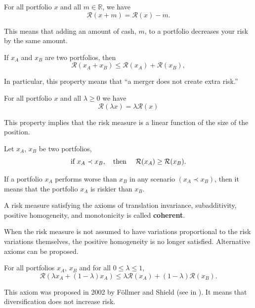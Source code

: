 \begin{axiom} For all portfolio $x$ and all $m\in\mathbb{R}$,  we have
	\[
		\mathcal{R}(x+m) = \mathcal{R}(x)-m.
	\]
\end{axiom}
This means that adding an amount of cash, $m$, to a portfolio decreases your risk by the same amount.

\begin{axiom}[Subadditivity] If $x_A$ and $x_B$ are two portfolios, then
	\[
		\mathcal{R}(x_A+x_B) \leq \mathcal{R}(x_A) + \mathcal{R}(x_B),
	\]
\end{axiom}
In particular, this property means that ``a merger does not create extra risk.''

\begin{axiom} For all portfolio $x$ and all $\lambda\geq 0$ we have
	\[
		\mathcal{R}(\lambda x) = \lambda \mathcal{R}(x)
	\]
\end{axiom}
This property implies that the risk measure is a linear function of the size of the position.

\begin{axiom}[Monotonicity] Let $x_A$, $x_B$ be two portfolios,
	\[
		\mbox{if } x_A \prec x_B, \quad \mbox{then } \quad \mathcal{R}(x_A) \geq \mathcal{R}(x_B).\\
	\]
\end{axiom}
If a portfolio $x_A$ performs worse than $x_B$ in any
scenario $(x_A \prec x_B)$, then it means that the portfolio $x_A$ is
riskier than $x_B$.

\begin{definition}
	A risk measure satisfying the axioms of translation invariance, subadditivity, positive homogeneity, and monotonicity is called \textbf{coherent}.
\end{definition}


When the risk measure is not assumed to have variations proportional to the risk variations themselves, the positive homogeneity is no longer satisfied. Alternative axioms can be proposed.

\begin{axiom}[Convexity] For all portfolios $x_A$, $x_B$ and for all $0\leq \lambda \leq 1$,
	\[
		\mathcal{R}(\lambda x_A + (1-\lambda)x_A) \leq \lambda \mathcal{R}(x_A) + (1-\lambda) \mathcal{R}(x_B).
	\]
\end{axiom}

This axiom  was proposed in 2002 by Föllmer and Shield (see in \cite{Follmer2002}). It means that diversification does not increase risk.

